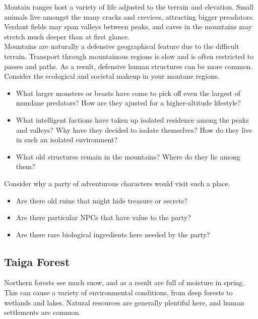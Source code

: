 \documentclass[a4paper]{article}
\begin{document}
\begin{multicols}{2}
Moutain ranges host a variety of life adjusted to the terrain and elevation. Small animals live amongst the many cracks and crevices, attracting bigger preadators. Verdant fields may span valleys between peaks, and caves in the mountains may stretch much deeper than at first glance. \\

Mountains are naturally a defensive geographical feature due to the difficult terrain. Transport through mountainous regions is slow and is often restricted to passes and paths. As a result, defensive human structures can be more common. \\

Consider the ecological and societal makeup in your montane regions.

\begin{itemize}
\item What larger monsters or beasts have come to pick off even the largest of mundane predators? How are they ajusted for a higher-altitude lifestyle?
\item What intelligent factions have taken up isolated residence among the peaks and valleys? Why have they decided to isolate themselves? How do they live in such an isolated environment?
\item What old structures remain in the mountains? Where do they lie among them?
\end{itemize}

Consider why a party of adventurous characters would visit such a place.

\begin{itemize}
\item Are there old ruins that might hide treasure or secrets?
\item Are there particular NPCs that have value to the party?
\item Are there rare biological ingredients here needed by the party?
\end{itemize}



\subsection{Taiga Forest}

Northern forests see much snow, and as a result are full of moisture in spring. This can cause a variety of environmental conditions, from deep forests to wetlands and lakes. Natural resources are generally plentiful here, and human settlements are common. \\


\end{multicols}
\end{document}
